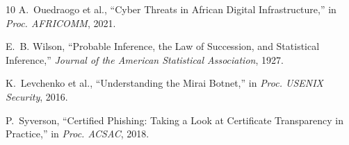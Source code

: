 \documentclass[conference]{IEEEtran}
\begin{document}
\begin{thebibliography}{10}
A.~Ouedraogo et al., ``Cyber Threats in African Digital Infrastructure,'' in \textit{Proc. AFRICOMM}, 2021.

E.~B. Wilson, ``Probable Inference, the Law of Succession, and Statistical Inference,'' \textit{Journal of the American Statistical Association}, 1927.

K.~Levchenko et al., ``Understanding the Mirai Botnet,'' in \textit{Proc. USENIX Security}, 2016.

P.~Syverson, ``Certified Phishing: Taking a Look at Certificate Transparency in Practice,'' in \textit{Proc. ACSAC}, 2018.

\end{thebibliography}
\end{document}
